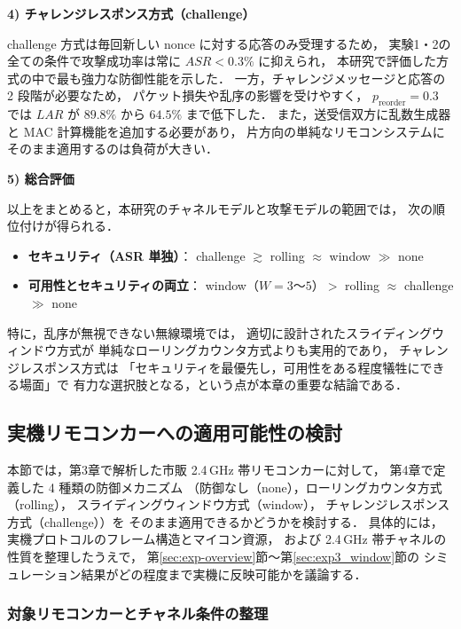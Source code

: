 \documentclass[twocolumn,10pt,a4paper]{jsarticle}
\begin{document}
\vspace{1em}
\noindent\textbf{4) チャレンジレスポンス方式（challenge）}\par
challenge 方式は毎回新しい nonce に対する応答のみ受理するため，
実験1・2の全ての条件で攻撃成功率は常に $ASR < 0.3\%$ に抑えられ，
本研究で評価した方式の中で最も強力な防御性能を示した．
一方，チャレンジメッセージと応答の 2 段階が必要なため，
パケット損失や乱序の影響を受けやすく，
$p_{\mathrm{reorder}}=0.3$ では $LAR$ が
$89.8\%$ から $64.5\%$ まで低下した．
また，送受信双方に乱数生成器と MAC 計算機能を追加する必要があり，
片方向の単純なリモコンシステムにそのまま適用するのは負荷が大きい．

\vspace{1em}
\noindent\textbf{5) 総合評価}\par
以上をまとめると，本研究のチャネルモデルと攻撃モデルの範囲では，
次の順位付けが得られる．
\begin{itemize}
  \item \textbf{セキュリティ（ASR 単独）}：
        challenge $\gtrsim$ rolling $\approx$ window $\gg$ none
  \item \textbf{可用性とセキュリティの両立}：
        window（$W=3$～$5$）$>$ rolling $\approx$ challenge $\gg$ none
\end{itemize}

特に，乱序が無視できない無線環境では，
適切に設計されたスライディングウィンドウ方式が
単純なローリングカウンタ方式よりも実用的であり，
チャレンジレスポンス方式は
「セキュリティを最優先し，可用性をある程度犠牲にできる場面」で
有力な選択肢となる，という点が本章の重要な結論である．

\subsection{実機リモコンカーへの適用可能性の検討}

\label{subsec:rc-car-applicability}

本節では，第3章で解析した市販 2.4\,GHz 帯リモコンカーに対して，
第4章で定義した 4 種類の防御メカニズム
（防御なし（none），ローリングカウンタ方式（rolling），
スライディングウィンドウ方式（window），
チャレンジレスポンス方式（challenge））を
そのまま適用できるかどうかを検討する．
具体的には，実機プロトコルのフレーム構造とマイコン資源，
および 2.4\,GHz 帯チャネルの性質を整理したうえで，
第\ref{sec:exp-overview}節～第\ref{sec:exp3_window}節の
シミュレーション結果がどの程度まで実機に反映可能かを議論する．

\subsubsection{対象リモコンカーとチャネル条件の整理}
\end{document}
